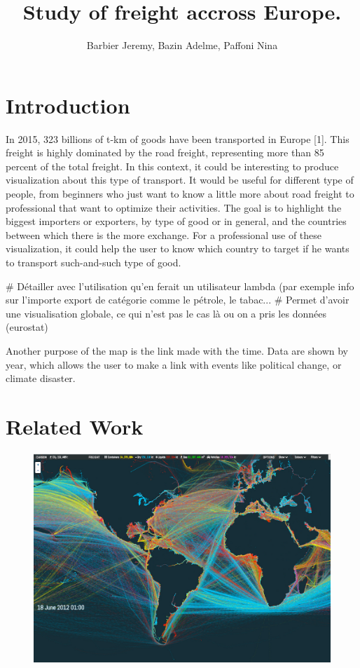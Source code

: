 \documentclass{vgtc}
\title{Study of freight accross Europe.}
\author{Barbier Jeremy, Bazin Adelme, Paffoni Nina}
\begin{document}
\maketitle

\section{Introduction}
In 2015, 323 billions of t-km of goods have been transported in Europe [1]. This freight is highly dominated by the road freight, representing more than 85 percent of the total freight. In this context, it could be interesting to produce visualization about this type of transport. It would be useful for different type of people, from beginners who just want to know a little more about road freight to professional that want to optimize their activities. 
The goal is to highlight the biggest importers or exporters, by type of good or in general, and the countries between which there is the more exchange. For a professional use of these visualization, it could help the user to know which country to target if he wants to transport such-and-such type of good.

# Détailler avec l'utilisation qu'en ferait un utilisateur lambda (par exemple info sur l'importe export de catégorie comme le pétrole, le tabac...
# Permet d'avoir une visualisation globale, ce qui n'est pas le cas là ou on a pris les données (eurostat)


Another purpose of the map is the link made with the time. Data are shown by year, which allows the user to make a link with events like political change, or climate disaster. 


\section{Related Work}

\begin{figure}[H]
\center
\includegraphics[scale=0.2]{shipmap.jpg}
\end{figure}
\end{document}
